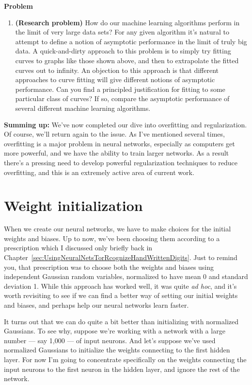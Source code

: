 \textbf{Problem}



\begin{enumerate}
\item \textbf{(Research problem)} How do our machine learning algorithms perform in the limit of very large data sets? For any given algorithm it's natural to attempt to define a notion of asymptotic performance in the limit of truly big data. A quick-and-dirty approach to this problem is to simply try fitting curves to graphs like those shown above, and then to extrapolate the fitted curves out to infinity. An objection to this approach is that different approaches to curve fitting will give different notions of asymptotic performance. Can you find a principled justification for fitting to some particular class of curves? If so, compare the asymptotic performance of several different machine learning algorithms. 
\end{enumerate}


\textbf{Summing up:} We've now completed our dive into overfitting and regularization. Of course, we'll return again to the issue. As I've mentioned several times, overfitting is a major problem in neural networks, especially as computers get more powerful, and we have the ability to train larger networks. As a result there's a pressing need to develop powerful regularization techniques to reduce overfitting, and this is an extremely active area of current work.

\section{Weight initialization}
\label{sec:Weightinitialization}
When we create our neural networks, we have to make choices for the initial weights and biases. Up to now, we've been choosing them according to a prescription which I discussed only briefly back in Chapter~\ref{sec:UsingNeuralNetsTorRcognizeHandWrittenDigits}. Just to remind you, that prescription was to choose both the weights and biases using independent Gaussian random variables, normalized to have mean 0 and standard deviation 1. While this approach has worked well, it was quite \textit{ad hoc}, and it's worth revisiting to see if we can find a better way of setting our initial weights and biases, and perhaps help our neural networks learn faster.

It turns out that we can do quite a bit better than initializing with normalized Gaussians. To see why, suppose we're working with a network with a large number --- say 1,000 --- of input neurons. And let's suppose we've used normalized Gaussians to initialize the weights connecting to the first hidden layer. For now I'm going to concentrate specifically on the weights connecting the input neurons to the first neuron in the hidden layer, and ignore the rest of the network.

